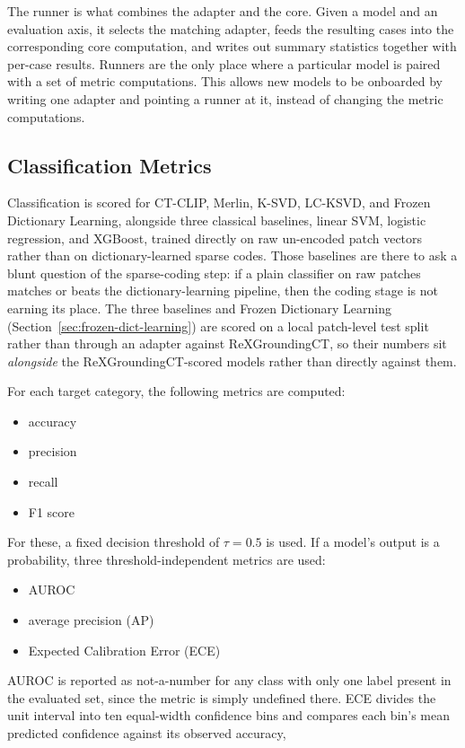 The runner is what combines the adapter and the core. Given a model and an evaluation axis, it selects the
matching adapter, feeds the resulting cases into the corresponding core computation, and
writes out summary statistics together with per-case results. Runners are the only place
where a particular model is paired with a set of metric computations.
This allows new models to be onboarded by writing one adapter and pointing a runner at
it, instead of changing the metric computations.

\subsection{Classification Metrics}
\label{sec:eval-classification}

Classification is scored for CT-CLIP, Merlin, K-SVD, LC-KSVD, and Frozen Dictionary
Learning, alongside three classical baselines, linear SVM, logistic regression, and
XGBoost, trained directly on raw un-encoded patch vectors rather than on dictionary-learned
sparse codes. Those baselines are there to ask a blunt question of the sparse-coding step:
if a plain classifier on raw patches matches or beats the dictionary-learning pipeline, then
the coding stage is not earning its place. The three baselines and Frozen Dictionary
Learning (Section~\ref{sec:frozen-dict-learning}) are scored on a local patch-level test
split rather than through an adapter against ReXGroundingCT, so their numbers sit
\emph{alongside} the ReXGroundingCT-scored models rather than directly against them.

For each target category, the following metrics are computed:
\begin{itemize}
    \item accuracy
    \item precision
    \item recall
    \item F1 score
\end{itemize}

For these, a fixed decision threshold of $\tau = 0.5$ is used.
If a model's output is a probability, three threshold-independent metrics are used:
\begin{itemize}
    \item AUROC
    \item average precision (AP)
    \item Expected Calibration Error (ECE)
\end{itemize}

AUROC is reported as not-a-number for any class with only one
label present in the evaluated set, since the metric is simply undefined there.
ECE divides the unit interval into ten equal-width confidence bins and compares each bin's mean
predicted confidence against its observed accuracy,

